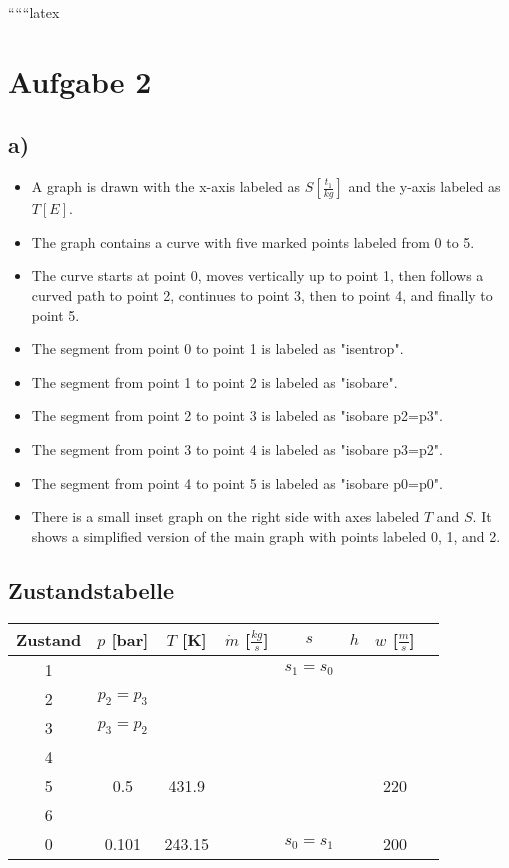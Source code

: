 
``````latex


\section*{Aufgabe 2}

\subsection*{a)}

\begin{itemize}
    \item A graph is drawn with the x-axis labeled as $S \left[\frac{t_1}{kg}\right]$ and the y-axis labeled as $T \left[E\right]$.
    \item The graph contains a curve with five marked points labeled from 0 to 5.
    \item The curve starts at point 0, moves vertically up to point 1, then follows a curved path to point 2, continues to point 3, then to point 4, and finally to point 5.
    \item The segment from point 0 to point 1 is labeled as "isentrop".
    \item The segment from point 1 to point 2 is labeled as "isobare".
    \item The segment from point 2 to point 3 is labeled as "isobare p2=p3".
    \item The segment from point 3 to point 4 is labeled as "isobare p3=p2".
    \item The segment from point 4 to point 5 is labeled as "isobare p0=p0".
    \item There is a small inset graph on the right side with axes labeled $T$ and $S$. It shows a simplified version of the main graph with points labeled 0, 1, and 2.
\end{itemize}

\subsection*{Zustandstabelle}

\begin{tabular}{|c|c|c|c|c|c|c|c|}
    \hline
    Zustand & $p$ [bar] & $T$ [K] & $\dot{m}$ [\(\frac{kg}{s}\)] & $s$ & $h$ & $w$ [\(\frac{m}{s}\)] \\
    \hline
    1 & & & & $s_1=s_0$ & & \\
    \hline
    2 & $p_2=p_3$ & & & & & \\
    \hline
    3 & $p_3=p_2$ & & & & & \\
    \hline
    4 & & & & & & \\
    \hline
    5 & 0.5 & 431.9 & & & & 220 \\
    \hline
    6 & & & & & & \\
    \hline
    0 & 0.101 & 243.15 & & $s_0=s_1$ & & 200 \\
    \hline
\end{tabular}

